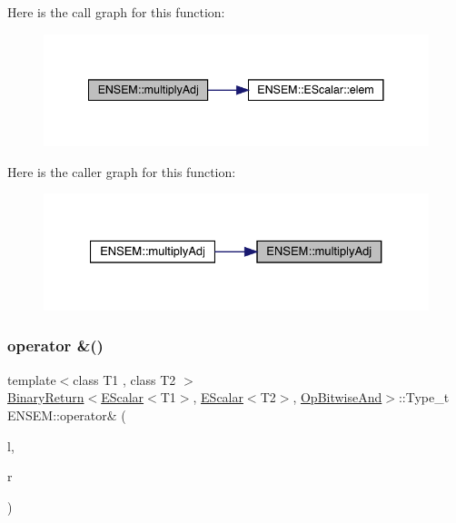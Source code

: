 Here is the call graph for this function\+:
\nopagebreak
\begin{figure}[H]
\begin{center}
\leavevmode
\includegraphics[width=341pt]{d4/dca/group__escalar_ga90260817012914a08b2475f4cc5c94a7_cgraph}
\end{center}
\end{figure}
Here is the caller graph for this function\+:
\nopagebreak
\begin{figure}[H]
\begin{center}
\leavevmode
\includegraphics[width=327pt]{d4/dca/group__escalar_ga90260817012914a08b2475f4cc5c94a7_icgraph}
\end{center}
\end{figure}
\mbox{\label{group__escalar_ga445352dd6ecea4dcb57bfd1abcda2a0b}} 
\subsubsection{\texorpdfstring{operator \&()}{operator \&()}}
{\footnotesize\ttfamily template$<$class T1 , class T2 $>$ \\
\mbox{\hyperlink{structENSEM_1_1BinaryReturn}{Binary\+Return}}$<$\mbox{\hyperlink{classENSEM_1_1EScalar}{E\+Scalar}}$<$T1$>$, \mbox{\hyperlink{classENSEM_1_1EScalar}{E\+Scalar}}$<$T2$>$, \mbox{\hyperlink{structENSEM_1_1OpBitwiseAnd}{Op\+Bitwise\+And}}$>$\+::Type\+\_\+t E\+N\+S\+E\+M\+::operator\& (\begin{DoxyParamCaption}\item[{const \mbox{\hyperlink{classENSEM_1_1EScalar}{E\+Scalar}}$<$ T1 $>$ \&}]{l,  }\item[{const \mbox{\hyperlink{classENSEM_1_1EScalar}{E\+Scalar}}$<$ T2 $>$ \&}]{r }\end{DoxyParamCaption})\hspace{0.3cm}{\ttfamily [inline]}}

